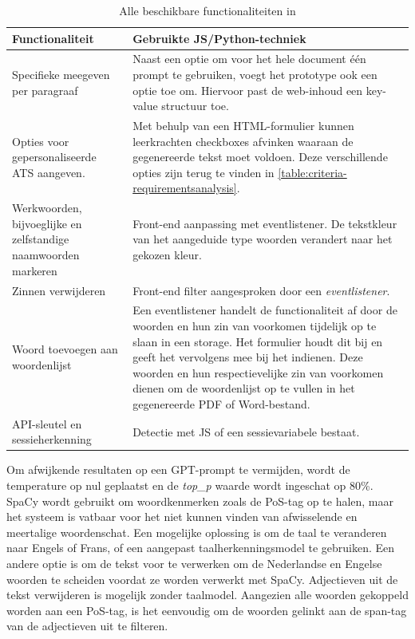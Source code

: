 \begin{center}
	\begin{table}
		\begin{tabular}{ | m{7cm} | m{7cm} } 
			\hline
			\textbf{Functionaliteit} & Gebruikte JS/Python-techniek \\
			\hline
			Specifieke meegeven per paragraaf & Naast een optie om voor het hele document één prompt te gebruiken, voegt het prototype ook een optie toe om. Hiervoor past de web-inhoud een key-value structuur toe. \\
			\hline
			Opties voor gepersonaliseerde ATS aangeven. & Met behulp van een HTML-formulier kunnen leerkrachten checkboxes afvinken waaraan de gegenereerde tekst moet voldoen. Deze verschillende opties zijn terug te vinden in \ref{table:criteria-requirementsanalysis}. \\
			\hline
			Werkwoorden, bijvoeglijke en zelfstandige naamwoorden markeren & Front-end aanpassing met eventlistener. De tekstkleur van het aangeduide type woorden verandert naar het gekozen kleur. \\
			\hline
			Zinnen verwijderen & Front-end filter aangesproken door een \textit{eventlistener}. \\
			\hline
			Woord toevoegen aan woordenlijst & Een eventlistener handelt de functionaliteit af door de woorden en hun zin van voorkomen tijdelijk op te slaan in een storage. Het formulier houdt dit bij en geeft het vervolgens mee bij het indienen. Deze woorden en hun respectievelijke zin van voorkomen dienen om de woordenlijst op te vullen in het gegenereerde PDF of Word-bestand.\\ 
			\hline
			API-sleutel en sessieherkenning & Detectie met JS of een sessievariabele bestaat.
			\hline 
		\end{tabular}
	\label{table:functionaliteiten-leerkrachten}
	\caption{Alle beschikbare functionaliteiten in }
	\end{table}
\end{center}



\medspace

Om afwijkende resultaten op een GPT-prompt te vermijden, wordt de temperature op nul geplaatst en de \textit{top\_p} waarde wordt ingeschat op 80\%. SpaCy wordt gebruikt om woordkenmerken zoals de PoS-tag op te halen, maar het systeem is vatbaar voor het niet kunnen vinden van afwisselende en meertalige woordenschat. Een mogelijke oplossing is om de taal te veranderen naar Engels of Frans, of een aangepast taalherkenningsmodel te gebruiken. Een andere optie is om de tekst voor te verwerken om de Nederlandse en Engelse woorden te scheiden voordat ze worden verwerkt met SpaCy. Adjectieven uit de tekst verwijderen is mogelijk zonder taalmodel. Aangezien alle woorden gekoppeld worden aan een PoS-tag, is het eenvoudig om de woorden gelinkt aan de span-tag van de adjectieven uit te filteren.

